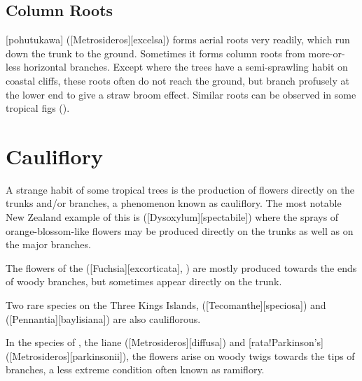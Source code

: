 \subsection{Column Roots}

[pohutukawa] ([Metrosideros][excelsa]) forms aerial roots very readily, which run down the trunk to the ground.
Sometimes it forms column roots from more-or-less horizontal branches.
Except where the trees have a semi-sprawling habit on coastal cliffs, these roots often do not reach the ground, but branch profusely at the lower end to give a straw broom effect.
Similar roots can be observed in some tropical figs ().

\section{Cauliflory}

A strange habit of some tropical trees is the production of flowers directly on the trunks and/or branches, a phenomenon known as cauliflory.
The most notable New Zealand example of this is  ([Dysoxylum][spectabile]) where the sprays of orange-blossom-like flowers may be produced directly on the trunks as well as on the major branches.

The flowers of the  ([Fuchsia][excorticata], ) are mostly produced towards the ends of woody branches, but sometimes appear directly on the trunk.

Two rare species on the Three Kings Islands,  ([Tecomanthe][speciosa]) and  ([Pennantia][baylisiana]) are also cauliflorous.

In the species of ,  the liane  ([Metrosideros][diffusa]) and [rata!Parkinson's] ([Metrosideros][parkinsonii]), the flowers arise on woody twigs towards the tips of branches, a less extreme condition often known as ramiflory.

